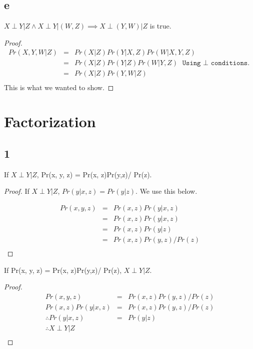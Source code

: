 \documentclass{article}
\begin{document}
\subsection{e}
\begin{claim}
$X \perp Y|Z \land X \perp Y | (W, Z) \implies X \perp (Y, W)|Z$ is true.
\end{claim}
\begin{proof}
\begin{eqnarray*}
Pr(X,Y,W|Z) &=& Pr(X|Z)Pr(Y|X, Z)Pr(W|X, Y, Z)\\
&=& Pr(X|Z)Pr(Y|Z)Pr(W|Y, Z)\texttt{ Using $\perp$ conditions.}\\
&=& Pr(X|Z)Pr(Y, W|Z)\\
\end{eqnarray*}
This is what we wanted to show.
\end{proof}

\section{Factorization}
\subsection{1}
\begin{lem}
If $X \perp Y | Z$, Pr(x, y, z) = Pr(x, z)Pr(y,z)/ Pr(z).
\end{lem}
\begin{proof}
If $X \perp Y | Z$, $Pr(y|x,z) = Pr(y|z)$. We use this below.

\begin{eqnarray*}
Pr(x, y, z) &=& Pr(x, z)Pr(y|x, z)\\
&=& Pr(x, z)Pr(y|x, z)\\
&=& Pr(x, z)Pr(y|z)\\
&=& Pr(x, z)Pr(y,z)/ Pr(z)\\
\end{eqnarray*}
\end{proof}

\begin{lem}
If Pr(x, y, z) = Pr(x, z)Pr(y,z)/ Pr(z), $X \perp Y | Z$.
\end{lem}
\begin{proof}
\begin{eqnarray*}
Pr(x, y, z) &=& Pr(x, z)Pr(y,z)/ Pr(z)\\
Pr(x, z)Pr(y|x, z) &=& Pr(x, z)Pr(y,z)/ Pr(z)\\
\therefore Pr(y|x, z) &=& Pr(y|z)\\
\therefore X \perp Y | Z\\
\end{eqnarray*}
\end{proof}
\end{document}
